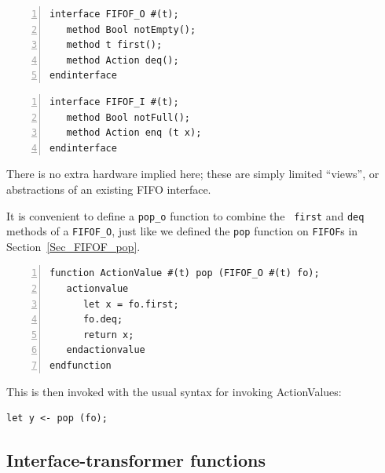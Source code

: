
{\small
\begin{Verbatim}[frame=single, numbers=left]
interface FIFOF_O #(t);
   method Bool notEmpty();
   method t first();
   method Action deq();
endinterface
\end{Verbatim}
}


{\small
\begin{Verbatim}[frame=single, numbers=left]
interface FIFOF_I #(t);
   method Bool notFull();
   method Action enq (t x);
endinterface
\end{Verbatim}
}

There is no extra hardware implied here; these are simply limited
``views'', or abstractions of an existing FIFO interface.


It is convenient to define a \verb|pop_o| function to combine the {\tt
first} and {\tt deq} methods of a {\tt FIFOF\_O}, just like we defined
the {\tt pop} function on {\tt FIFOF}s in Section~\ref{Sec_FIFOF_pop}.

{\small
\begin{Verbatim}[frame=single, numbers=left]
function ActionValue #(t) pop (FIFOF_O #(t) fo);
   actionvalue
      let x = fo.first;
      fo.deq;
      return x;
   endactionvalue
endfunction
\end{Verbatim}
}

This is then invoked with the usual syntax for invoking ActionValues:

{\small
\begin{Verbatim}[frame=single]
   let y <- pop (fo);
\end{Verbatim}
}



\subsection{Interface-transformer functions}

\label{Sec_interface_transfomers}


